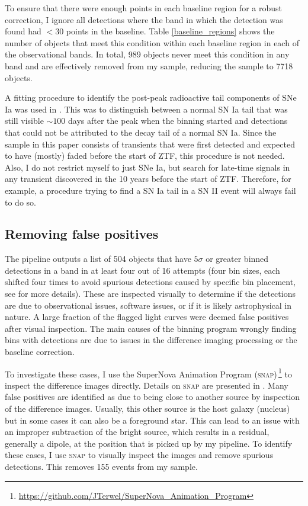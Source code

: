 \documentclass[a4paper,oneside,12pt, class=Latex/Classes/PhDthesisPSnPDF, crop=false]{standalone}
\begin{document}
To ensure that there were enough points in each baseline region for a robust correction, I ignore all detections where the band in which the detection was found had $< 30$ points in the baseline. Table \ref{baseline_regions} shows the number of objects that meet this condition within each baseline region in each of the observational bands. In total, 989 objects never meet this condition in any band and are effectively removed from my sample, reducing the sample to 7718 objects.

A fitting procedure to identify the post-peak radioactive tail components of SNe Ia was used in \citet{Terwel_2024_paper1}. This was to distinguish between a normal SN Ia tail that was still visible $\sim100$ days after the peak when the binning started and detections that could not be attributed to the decay tail of a normal SN Ia. Since the sample in this paper consists of transients that were first detected and expected to have (mostly) faded before the start of ZTF, this procedure is not needed. Also, I do not restrict myself to just SNe Ia, but search for late-time signals in any transient discovered in the 10 years before the start of ZTF. Therefore, for example, a procedure trying to find a SN Ia tail in a SN II event will always fail to do so.


\subsection{Removing false positives}
\label{sec:false_positives}
The pipeline outputs a list of 504 objects that have $5\sigma$ or greater binned detections in a band in at least four out of 16 attempts (four bin sizes, each shifted four times to avoid spurious detections caused by specific bin placement, see \citealt{Terwel_2024_paper1} for more details). These are inspected visually to determine if the detections are due to observational issues, software issues, or if it is likely astrophysical in nature. A large fraction of the flagged light curves were deemed false positives after visual inspection. The main causes of the binning program wrongly finding bins with detections are due to issues in the difference imaging processing or the baseline correction.

To investigate these cases, I use the SuperNova Animation Program (\textsc{snap})\,\footnote{\url{https://github.com/JTerwel/SuperNova_Animation_Program}} to inspect the difference images directly. Details on \textsc{snap} are presented in \citet{Terwel_2024_paper1}. Many false positives are identified as due to being close to another source by inspection of the difference images. Usually, this other source is the host galaxy (nucleus) but in some cases it can also be a foreground star. This can lead to an issue with an improper subtraction of the bright source, which results in a residual, generally a dipole, at the position that is picked up by my pipeline. To identify these cases, I use \textsc{snap} to visually inspect the images and remove spurious detections. This removes 155 events from my sample.
\end{document}
